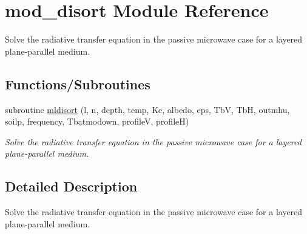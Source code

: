 \hypertarget{namespacemod__disort}{
\section{mod\_\-disort Module Reference}
\label{namespacemod__disort}
}


Solve the radiative transfer equation in the passive microwave case for a layered plane-\/parallel medium.  


\subsection*{Functions/Subroutines}
\begin{DoxyCompactItemize}
\item 
subroutine \hyperlink{namespacemod__disort_a0c03d70e31fb8642ede055b6c867e8bc}{mldisort} (l, n, depth, temp, Ke, albedo, eps, TbV, TbH, outmhu, soilp, frequency, Tbatmodown, profileV, profileH)
\begin{DoxyCompactList}\small\item\em Solve the radiative transfer equation in the passive microwave case for a layered plane-\/parallel medium. \end{DoxyCompactList}\end{DoxyCompactItemize}


\subsection{Detailed Description}
Solve the radiative transfer equation in the passive microwave case for a layered plane-\/parallel medium. 

